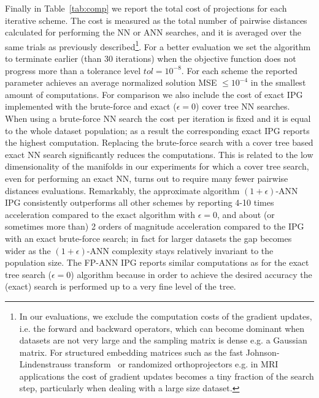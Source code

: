 Finally in Table~\ref{tab:comp} we report the total cost of projections for each iterative scheme. The cost is measured as the total number of pairwise distances calculated for performing the NN or ANN searches, and it is averaged over the same  trials as previously described\footnote{In our evaluations, we exclude the computation costs of the gradient updates, i.e. the forward and backward operators, which can become dominant when datasets are not very large and the sampling matrix is dense e.g. a Gaussian matrix. For structured embedding matrices such as the fast Johnson-Lindenstrauss transform~\cite{FJLT1} or randomized orthoprojectors e.g. in MRI applications the cost of gradient updates becomes a tiny fraction of the search step, particularly when dealing with a large size dataset.}. For a better evaluation we set the algorithm to terminate earlier (than 30 iterations) when the objective function does not progress more than a tolerance level $tol = 10^{-8}$.  
 For each scheme the reported parameter achieves an average normalized solution MSE $\leq10^{-4}$ in the smallest amount of computations. For comparison we also include the cost of exact IPG implemented with the brute-force and exact ($\epsilon=0$) cover tree NN searches.  When using a brute-force NN search the cost per iteration is fixed and it is equal to the whole dataset population; as a result the corresponding exact IPG reports the highest computation. Replacing the brute-force search with a cover tree based exact NN search significantly reduces the computations. This is related to the low dimensionality of the manifolds in our experiments for which a cover tree search, even for performing an exact NN,  turns out to require many fewer pairwise distances evaluations.  
  Remarkably, the approximate algorithm $(1+\epsilon)$-ANN IPG 
  consistently outperforms all other schemes by reporting 4-10 times acceleration compared to the exact algorithm with $\epsilon=0$, and about (or sometimes more than) 2 orders of magnitude acceleration compared to the IPG with an exact brute-force search; in fact for larger  datasets the gap becomes wider as the $(1+\epsilon)$-ANN complexity stays relatively invariant to the population size.   
The FP-ANN IPG reports similar computations as for the exact tree search ($\epsilon=0$) algorithm because in order to achieve the desired accuracy the (exact) search is performed up to a very fine level of the tree. 
